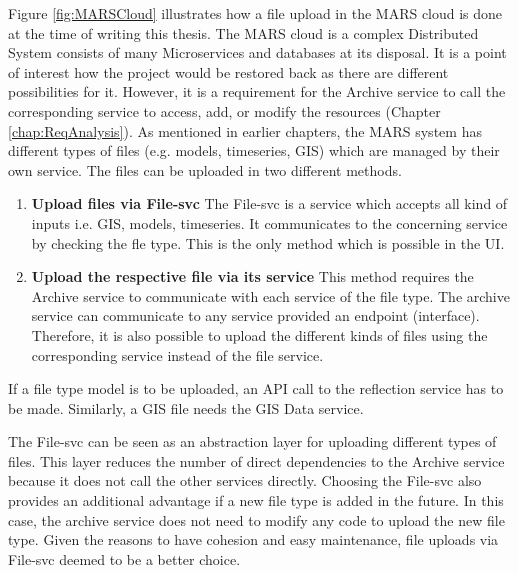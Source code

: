 Figure \ref{fig:MARSCloud} illustrates how a file upload in the MARS cloud is done at the time of writing this thesis. 
The MARS cloud is a complex Distributed System consists of many 
Microservices and databases at its disposal. It is a point of interest how the project would be restored back as there are different possibilities for it. 
However, it is a requirement for the Archive service
to call the corresponding service to access, add, or modify the resources (Chapter \ref{chap:ReqAnalysis}). As mentioned in earlier chapters, the MARS system
has different types of files (e.g. models, timeseries, GIS) which are managed by their own service. The files can be uploaded in two different methods.
\begin{enumerate}
 \item \textbf{Upload files via File-svc} The File-svc is a service which accepts all kind of inputs i.e. GIS, models, timeseries. It communicates to the
 concerning service by checking the fle type. This is the only method which is possible in the UI.  
 \item \textbf{Upload the respective file via its service} This method requires the Archive service to communicate with each service of the file type. 
The archive service can communicate to any service provided an endpoint (interface). Therefore, it is also possible to upload the different kinds of files using the
corresponding service instead of the file service. 
\end{enumerate} 

If a file type model is to be uploaded, an API call to the reflection service has to be made. Similarly, a GIS
file needs the GIS Data service.

The File-svc can be seen as an abstraction layer for uploading different types of files. This layer reduces the number of direct dependencies to the Archive
service because it does not call the other services directly. Choosing the File-svc also provides an additional advantage if a new file type is added in the future.
In this case, the archive service does not need to modify any code to upload the new file type. Given the reasons to have cohesion and easy maintenance, file uploads
via File-svc deemed to be a better choice. 

